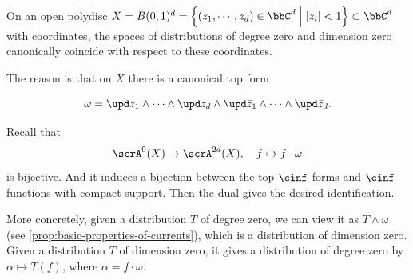 \begin{remark}[label=\labelNFM{rmk:degree-and-dimension-coincide-on-coordinate-ball}, status=draft, tag=0000000]
	On an open polydisc $X = B(0,1)^d = \left\{ (z_1,\cdots,z_d) \in \bbC^d \;\middle|\; |z_i| < 1 \right\} \subset \bbC^d$ with coordinates, the spaces of distributions of degree zero and dimension zero canonically coincide with respect to these coordinates.

	The reason is that on $X$ there is a canonical top form

\[ \omega = \upd z_1 \wedge \cdots \wedge \upd z_d \wedge \upd\bar z_1 \wedge \cdots \wedge \upd\bar z_d. \]

	Recall that
	\[ \scrA^0(X) \to \scrA^{2d}(X), \quad f \mapsto f \cdot \omega \]
	is bijective.
	And it induces a bijection between the top $\cinf$ forms and $\cinf$ functions with compact support.
	Then the dual gives the desired identification.

	More concretely, given a distribution $T$ of degree zero, we can view it as $T \wedge \omega$ (see \cref{prop:basic-properties-of-currents}), which is a distribution of dimension zero.
	Given a distribution $T$ of dimension zero, it gives a distribution of degree zero by $\alpha \mapsto T(f)$, where $\alpha = f \cdot \omega$.
\end{remark}

